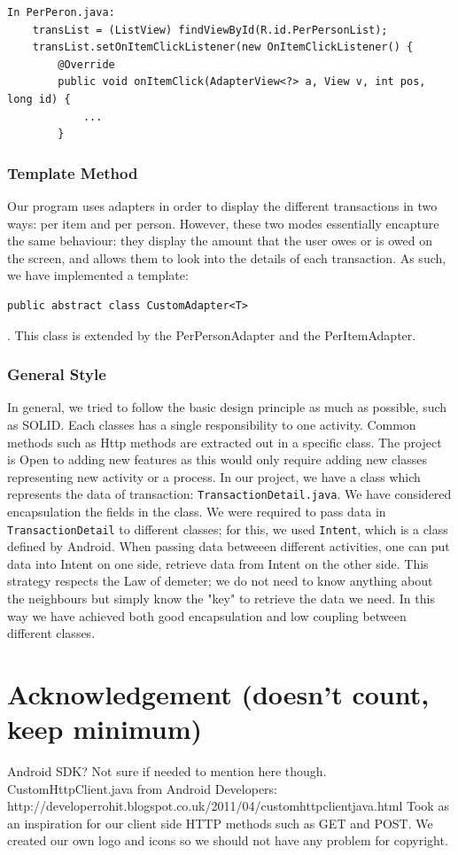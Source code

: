 \documentclass[a4paper,11pt]{article}
\begin{document}
\begin{center}
\begin{verbatim}
In PerPeron.java:
	transList = (ListView) findViewById(R.id.PerPersonList);
	transList.setOnItemClickListener(new OnItemClickListener() {
		@Override
		public void onItemClick(AdapterView<?> a, View v, int pos, long id) {
			...
		}
\end{verbatim}
\end{center}
\subsubsection*{Template Method}
Our program uses adapters in order to display the different transactions in two ways: per item and per person. However, these two modes essentially encapture the same behaviour: they display the amount that the user owes or is owed on the screen, and allows them to look into the details of each transaction. As such, we have implemented a template: 
\begin{verbatim}
public abstract class CustomAdapter<T> 
\end{verbatim}.
This class is extended by the PerPersonAdapter and the PerItemAdapter.

\subsubsection*{General Style}
In general, we tried to follow the basic design principle as much as possible, such as SOLID. Each classes has a single responsibility to one activity. Common methods such as Http methods are extracted out in a specific class. The project is Open to adding new features as this would only require adding new classes representing new activity or a process. In our project, we have a class which represents the data of transaction: \texttt{TransactionDetail.java}. We have considered encapsulation the fields in the class. We were required to pass data in \texttt{TransactionDetail} to different classes; for this, we used \texttt{Intent}, which is a class defined by Android. When passing data betweeen different activities, one can put data into Intent on one side, retrieve data from Intent on the other side. This strategy respects the Law of demeter; we do not need to know anything about the neighbours but simply know the "key" to retrieve the data we need. In this way we have achieved both good encapsulation and low coupling between different classes.
 
\section{Acknowledgement (doesn’t count, keep minimum)}
Android SDK? Not sure if needed to mention here though.
CustomHttpClient.java from Android Developers: http://developerrohit.blogspot.co.uk/2011/04/customhttpclientjava.html
Took as an inspiration for our client side HTTP methods such as GET and POST.
We created our own logo and icons so we should not have any problem for copyright. 
\end{document}
